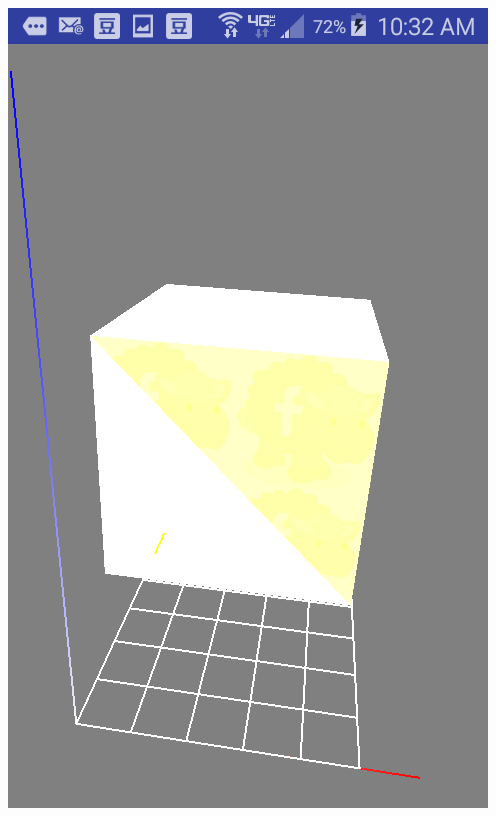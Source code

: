 \documentclass[9pt,b5paper]{article}
\begin{document}
\includegraphics[width=.9\linewidth]{./Screenshot_2016-04-30-10-32-08.png}
\end{document}
